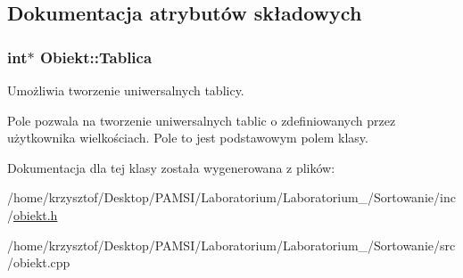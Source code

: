 \subsection{\-Dokumentacja atrybutów składowych}
\hypertarget{class_obiekt_a877ac2b65043327767012c184067f269}{
\subsubsection[{\-Tablica}]{\setlength{\rightskip}{0pt plus 5cm}int$\ast$ {\bf \-Obiekt\-::\-Tablica}}}\label{class_obiekt_a877ac2b65043327767012c184067f269}


\-Umożliwia tworzenie uniwersalnych tablicy. 

\-Pole pozwala na tworzenie uniwersalnych tablic o zdefiniowanych przez użytkownika wielkościach. \-Pole to jest podstawowym polem klasy. 

\-Dokumentacja dla tej klasy została wygenerowana z plików\-:\begin{DoxyCompactItemize}
\item 
/home/krzysztof/\-Desktop/\-P\-A\-M\-S\-I/\-Laboratorium/\-Laboratorium\-\_/\-Sortowanie/inc/\hyperlink{obiekt_8h}{obiekt.\-h}\item 
/home/krzysztof/\-Desktop/\-P\-A\-M\-S\-I/\-Laboratorium/\-Laboratorium\-\_/\-Sortowanie/src/obiekt.\-cpp\end{DoxyCompactItemize}
